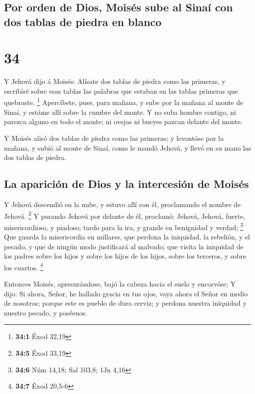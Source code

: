 \hypertarget{por-orden-de-dios-moisuxe9s-sube-al-sinauxed-con-dos-tablas-de-piedra-en-blanco}{%
\subsection{Por orden de Dios, Moisés sube al Sinaí con dos tablas de
piedra en
blanco}\label{por-orden-de-dios-moisuxe9s-sube-al-sinauxed-con-dos-tablas-de-piedra-en-blanco}}

\hypertarget{section-33}{%
\section{34}\label{section-33}}

 Y Jehová dijo á Moisés: Alísate dos tablas de piedra como
las primeras, y escribiré sobre esas tablas las palabras que estaban en
las tablas primeras que quebraste. \footnote{\textbf{34:1} Éxod 32,19}
 Apercíbete, pues, para mañana, y sube por la mañana al
monte de Sinaí, y estáme allí sobre la cumbre del monte. 
Y no suba hombre contigo, ni parezca alguno en todo el monte; ni ovejas
ni bueyes pazcan delante del monte.

 Y Moisés alisó dos tablas de piedra como las primeras; y
levantóse por la mañana, y subió al monte de Sinaí, como le mandó
Jehová, y llevó en su mano las dos tablas de piedra.

\hypertarget{la-apariciuxf3n-de-dios-y-la-intercesiuxf3n-de-moisuxe9s}{%
\subsection{La aparición de Dios y la intercesión de
Moisés}\label{la-apariciuxf3n-de-dios-y-la-intercesiuxf3n-de-moisuxe9s}}

 Y Jehová descendió en la nube, y estuvo allí con él,
proclamando el nombre de Jehová. \footnote{\textbf{34:5} Éxod 33,19}
 Y pasando Jehová por delante de él, proclamó: Jehová,
Jehová, fuerte, misericordioso, y piadoso; tardo para la ira, y grande
en benignidad y verdad; \footnote{\textbf{34:6} Núm 14,18; Sal 103,8;
  1Jn 4,16}  Que guarda la misericordia en millares, que
perdona la iniquidad, la rebelión, y el pecado, y que de ningún modo
justificará al malvado; que visita la iniquidad de los padres sobre los
hijos y sobre los hijos de los hijos, sobre los terceros, y sobre los
cuartos. \footnote{\textbf{34:7} Éxod 20,5-6}

 Entonces Moisés, apresurándose, bajó la cabeza hacia el
suelo y encorvóse;  Y dijo: Si ahora, Señor, he hallado
gracia en tus ojos, vaya ahora el Señor en medio de nosotros; porque
este es pueblo de dura cerviz; y perdona nuestra iniquidad y nuestro
pecado, y poséenos.

